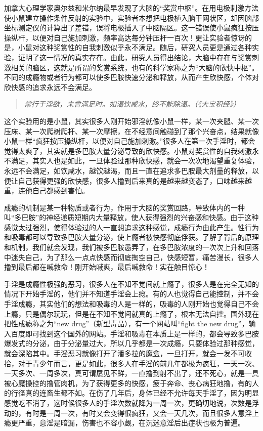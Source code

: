 加拿大心理学家奥尔兹和米尔纳最早发现了大脑的“奖赏中枢”。在用电极刺激方法使小鼠建立操作条件反射的实验中，实验者本想把电极植入脑干网状区，却因脑部坐标测定仪的计算出了差错，误将电极插入了中脑隔区。这一错误使小鼠疯狂按压操纵杆，以便对自己施加刺激，频率高达每分钟压杆一百次！更让实验者惊讶的是，小鼠对这种奖赏性的自我刺激似乎永不满足。随后，研究人员更是通过各种实验，证明了这一情况的真实存在。由此，研究人员得出结论，大脑中存在与奖赏刺激相关的脑区，这就是所谓的奖赏系统，也有的科学家称之为“大脑的欣快中枢”。不同的成瘾物或者行为都可以使多巴胺快速分泌和释放，从而产生欣快感，个体对欣快感的追求永远不会满足。

\begin{quote}\it
    常行于淫欲，未曾满足时。如渴饮咸水，终不能除渴。（《大宝积经》）
\end{quote}

这个实验用的是小鼠，其实很多人刚开始邪淫就像小鼠一样，某一次夹腿、某一次压床、某一次爬树爬杆、某一次摩擦，在不经意间触碰到了那个兴奋点，结果就像小鼠一样“疯狂按压操纵杆，以便对自己施加刺激。”很多人在第一次手淫时，都会觉得太爽了，其实就是多巴胺大量分泌导致的欣快感。小鼠对奖赏性的自我刺激永不满足，其实人也是如此，一旦体验过那种欣快感，就会一次次地渴望重复体验，永远不会满足，如饮咸水，越饮越渴，而且一直在追求多巴胺最大剂量的释放，以便让自己获得更强的欣快感，很多人撸到后来真的是越来越变态了，口味越来越重，连他自己都感到害怕。

成瘾的机制是某一种物质或者行为，作用于大脑的奖赏回路，导致体内的一种叫“多巴胺”的神经递质短期内大量释放，使人获得强烈的兴奋感和快感。由于这种感觉太过强烈，使得体验过的人一直想追求这种感觉，成瘾行为由此产生。性行为和吸毒都可以导致多巴胺大量分泌，使上瘾者被快感彻底俘获。了解了背后的原理和机制，我们就会发现，我们被多巴胺愚弄了，在多巴胺浓度的一次次上升和回落中迷失自己，为了那么一点点快感而彻底掏空自己，快感短暂，痛苦漫长，很多人撸到最后都在喊救命！刚开始喊爽，最后喊救命！实在触目惊心！

手淫是成瘾性极强的恶习，很多人在不知不觉间就上瘾了，很多人是在完全无知的情况下开始手淫的，他们并不知道手淫会上瘾。有的人也觉得自己能控制，并不会手淫成瘾，其实他们的想法和吸毒的人是一样的，吸毒的人刚开始也觉得自己不会上瘾，只是偶尔玩玩，但是在不知不觉间就真的上瘾了，根本无法自控。国外现在把性成瘾称之为“new drug”（新型毒品），有一个网站叫“fight the new drug”，输入百度即可找到这个国外的网站。手淫和吸毒在本质上是一样的，都会导致多巴胺爆发式的分泌，由于分泌量过大，所以几乎都是一次成瘾，只要体验过那种感觉，就会深陷其中。手淫恶习就像打开了潘多拉的魔盒，一旦打开，就会一发不可收拾，对于青少年而言，更是如此，很多人在手淫的前几年都极为疯狂，一天一次、一天多次、一周多次，真可谓屡见不鲜，一直撸到射不出了，还不死心，就是一具被心魔操控的撸管肉机，为了获得更多的快感，疲于奔命、丧心病狂地撸，有的人的行径真的连畜生都不如。在伤了几年后，身体已经不允许每天手淫了，因为明显感觉吃不消了，这时候很多人的手淫次数就降为一周一次，更确切地说，次数是浮动的，有时是一周一次，有时又会变得很疯狂，又会一天几次，而且很多人意淫上瘾更严重，意淫是暗漏，伤害也不容小觑，在沉迷意淫后出症状也极为普遍。


